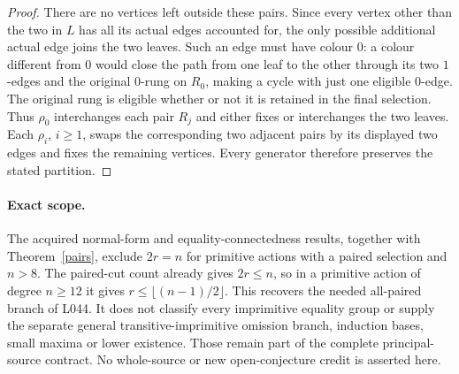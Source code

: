 \documentclass[11pt,a4paper]{article}
\begin{document}
\begin{proof}
There are no vertices left outside these pairs. Since
every vertex other than the two in $L$ has all its actual
edges accounted for, the only possible additional actual
edge joins the two leaves. Such an edge must have colour
$0$: a colour different from $0$ would close the path
from one leaf to the other through its two $1$-edges and
the original $0$-rung on $R_0$, making a cycle with just
one eligible $0$-edge. The original rung is eligible
whether or not it is retained in the final selection.
Thus $\rho_0$ interchanges each pair $R_j$ and either
fixes or interchanges the two leaves. Each $\rho_i$,
$i\ge1$, swaps the corresponding two adjacent pairs by
its displayed two edges and fixes the remaining vertices.
Every generator therefore preserves the stated partition.
\end{proof}

\paragraph{Exact scope.}
The acquired normal-form and equality-connectedness results,
together with Theorem~\ref{pairs}, exclude $2r=n$ for
primitive actions with a paired selection and $n>8$.
The paired-cut count already gives $2r\le n$, so in a
primitive action of degree $n\ge12$ it gives
$r\le\lfloor(n-1)/2\rfloor$. This recovers the needed
all-paired branch of L044. It does not classify every
imprimitive equality group or supply the separate general
transitive-imprimitive omission branch, induction bases,
small maxima or lower existence. Those remain part of the
complete principal-source contract. No whole-source or new
open-conjecture credit is asserted here.
\end{document}

